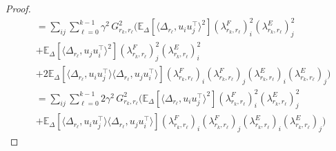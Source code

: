 \documentclass[11pt]{article}
\newcommand{\EE}{\mathbb{E}}
\begin{document}
\begin{proof}
\begin{align*}
&= \sum_{ij} \sum_{\ell=0}^{k-1} \gamma^2 \,  G_{r_k,r_\ell}^2 \Biggl( \EE_{\Delta}\left[\langle\Delta_{r_\ell}, u_i u_j^\top \rangle^2\right] (\lambda^F_{r_k,r_\ell})^2_i (\lambda^E_{r_k,r_\ell})^2_j \\
&+  \EE_{\Delta}\left[\langle\Delta_{r_\ell}, u_j u_i^\top \rangle^2\right] (\lambda^F_{r_k,r_\ell})^2_j (\lambda^E_{r_k,r_\ell})^2_i \nonumber \\
&+ 2 \EE_{\Delta}\left[\langle\Delta_{r_\ell}, u_i u_j^\top \rangle\langle\Delta_{r_\ell}, u_j u_i^\top \rangle\right]  (\lambda^F_{r_k,r_\ell})_i (\lambda^F_{r_k,r_\ell})_j (\lambda^E_{r_k,r_\ell})_i (\lambda^E_{r_k,r_\ell})_j \Biggr) \nonumber \\
&= \sum_{ij} \sum_{\ell=0}^{k-1} 2 \gamma^2 \,  G_{r_k,r_\ell}^2 \Biggl( \EE_{\Delta}\left[\langle\Delta_{r_\ell}, u_i u_j^\top \rangle^2\right] (\lambda^F_{r_k,r_\ell})^2_i (\lambda^E_{r_k,r_\ell})^2_j \\
&+ \EE_{\Delta}\left[\langle\Delta_{r_\ell}, u_i u_j^\top \rangle\langle\Delta_{r_\ell}, u_j u_i^\top \rangle\right] (\lambda^F_{r_k,r_\ell})_i (\lambda^F_{r_k,r_\ell})_j (\lambda^E_{r_k,r_\ell})_i (\lambda^E_{r_k,r_\ell})_j \Biggr) \nonumber
\end{align*}



\end{proof}
\end{document}
